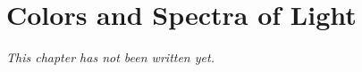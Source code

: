 \chapter{Colors and Spectra of Light}\label{ch:g8:colors-spectra}


\emph{This chapter has not been written yet.}
